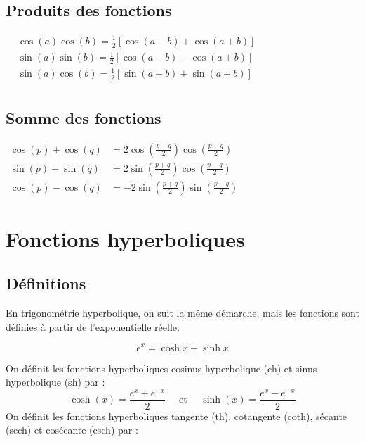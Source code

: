 \subsection{Produits des fonctions}

$
\begin{aligned} 
   & \cos (a) \cos (b)= \frac{1}{2} \left[\cos (a-b)+\cos (a+b)\right]\\ 
   & \sin (a) \sin (b)= \frac{1}{2}\left[\cos (a-b)-\cos (a+b) \right] \\ 
   &  \sin (a) \cos (b)= \frac{1}{2}\left[ \sin (a-b)+\sin (a+b) \right] \\
\end{aligned}
$

\subsection{Somme des fonctions}
$
\begin{aligned}
\cos (p)+\cos (q) & =2 \cos \left(\frac{p+q}{2}\right) \cos \left(\frac{p-q}{2}\right) \\
\sin (p)+\sin (q) & =2 \sin \left(\frac{p+q}{2}\right) \cos \left(\frac{p-q}{2}\right) \\
\cos (p)-\cos (q) & =-2 \sin \left(\frac{p+q}{2}\right) \sin \left(\frac{p-q}{2}\right)
\end{aligned}
$

\section{Fonctions hyperboliques}

\subsection{Définitions}

En trigonométrie hyperbolique, on suit la même démarche, mais les fonctions sont définies à partir de l'exponentielle réelle.

\begin{theorem}\label{form:}
        $$
        e^{x}=\cosh x+\sinh x 
        $$
\end{theorem}
On définit les fonctions hyperboliques cosinus hyperbolique (ch) et sinus hyperbolique (sh) par :
$$
\cosh(x)=\frac{e^{x}+e^{-x}}{2} \quad \text { et } \quad \sinh(x)=\frac{e^{x}-e^{-x}}{2}
$$
On définit les fonctions hyperboliques tangente (th), cotangente (coth), sécante (sech) et cosécante (csch) par :

